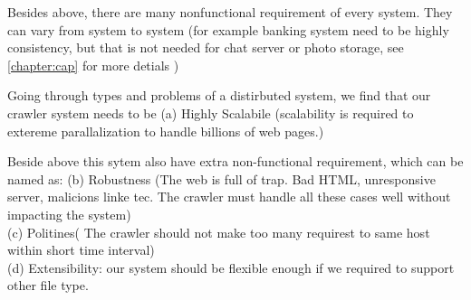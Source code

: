 Besides above, there are many nonfunctional requirement of every system. They can vary from system to system (for example banking system need to be highly consistency, but that is not needed for chat server or photo storage, see \ref{chapter:cap} for more detials )

Going through types and problems of a distirbuted system, we find that our crawler system needs to be (a) Highly Scalabile (scalability is required to extereme parallalization to handle billions of web pages.)

Beside above this sytem also have extra non-functional requirement, which can be named as:
(b) Robustness (The web is full of trap. Bad HTML, unresponsive server, malicions linke tec. The crawler must handle all these cases well without impacting the system)\\
(c) Politines( The crawler should not make too many requirest to same host within short time interval)\\
(d) Extensibility: our system should be flexible enough if we required to support other file type.
